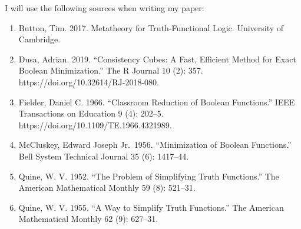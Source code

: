I will use the following sources when writing my paper:

\begin{enumerate}
\def\labelenumi{\arabic{enumi}.}
\tightlist
\item
  Button, Tim. 2017. Metatheory for Truth-Functional Logic. University
  of Cambridge.
\item
  Dusa, Adrian. 2019. ``Consistency Cubes: A Fast, Efficient Method for
  Exact Boolean Minimization.'' The R Journal 10 (2): 357.
  https://doi.org/10.32614/RJ-2018-080.
\item
  Fielder, Daniel C. 1966. ``Classroom Reduction of Boolean Functions.''
  IEEE Transactions on Education 9 (4): 202--5.
  https://doi.org/10.1109/TE.1966.4321989.
\item
  McCluskey, Edward Joseph Jr.~1956. ``Minimization of Boolean
  Functions.'' Bell System Technical Journal 35 (6): 1417--44.
\item
  Quine, W. V. 1952. ``The Problem of Simplifying Truth Functions.'' The
  American Mathematical Monthly 59 (8): 521--31.
\item
  Quine, W. V. 1955. ``A Way to Simplify Truth Functions.'' The American
  Mathematical Monthly 62 (9): 627--31.
\end{enumerate}
